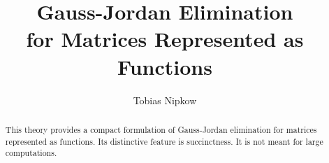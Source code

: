 \documentclass[11pt,a4paper]{article}
\begin{document}
\title{Gauss-Jordan Elimination\\ for Matrices Represented as Functions}
\author{Tobias Nipkow}
\maketitle

\begin{abstract}
This theory provides a compact formulation of Gauss-Jordan elimination
for matrices represented as functions. Its distinctive feature is succinctness.
It is not meant for large computations.
\end{abstract}


\end{document}
